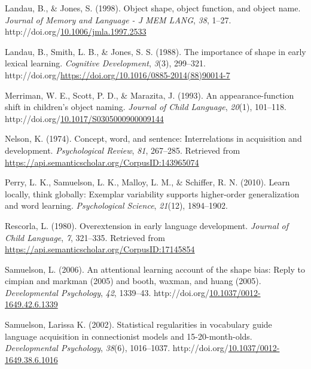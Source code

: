 \documentclass[10pt, letterpaper]{article}
\newenvironment{CSLReferences}%
  {}%
  {\par}
\begin{document}
\begin{CSLReferences}{1}{0}
\leavevmode{}%
Landau, B., \& Jones, S. (1998). Object shape, object function, and
object name. \emph{Journal of Memory and Language - J MEM LANG},
\emph{38}, 1--27.
http://doi.org/\href{https://doi.org/10.1006/jmla.1997.2533}{10.1006/jmla.1997.2533}

\leavevmode{}%
Landau, B., Smith, L. B., \& Jones, S. S. (1988). The importance of
shape in early lexical learning. \emph{Cognitive Development},
\emph{3}(3), 299--321.
http://doi.org/\url{https://doi.org/10.1016/0885-2014(88)90014-7}

\leavevmode{}%
Merriman, W. E., Scott, P. D., \& Marazita, J. (1993). An
appearance-function shift in children's object naming. \emph{Journal of
Child Language}, \emph{20}(1), 101--118.
http://doi.org/\href{https://doi.org/10.1017/S0305000900009144}{10.1017/S0305000900009144}

\leavevmode{}%
Nelson, K. (1974). Concept, word, and sentence: Interrelations in
acquisition and development. \emph{Psychological Review}, \emph{81},
267--285. Retrieved from
\url{https://api.semanticscholar.org/CorpusID:143965074}

\leavevmode{}%
Perry, L. K., Samuelson, L. K., Malloy, L. M., \& Schiffer, R. N.
(2010). Learn locally, think globally: Exemplar variability supports
higher-order generalization and word learning. \emph{Psychological
Science}, \emph{21}(12), 1894--1902.

\leavevmode{}%
Rescorla, L. (1980). Overextension in early language development.
\emph{Journal of Child Language}, \emph{7}, 321--335. Retrieved from
\url{https://api.semanticscholar.org/CorpusID:17145854}

\leavevmode{}%
Samuelson, L. (2006). An attentional learning account of the shape bias:
Reply to cimpian and markman (2005) and booth, waxman, and huang (2005).
\emph{Developmental Psychology}, \emph{42}, 1339--43.
http://doi.org/\href{https://doi.org/10.1037/0012-1649.42.6.1339}{10.1037/0012-1649.42.6.1339}

\leavevmode{}%
Samuelson, Larissa K. (2002). Statistical regularities in vocabulary
guide language acquisition in connectionist models and 15-20-month-olds.
\emph{Developmental Psychology}, \emph{38}(6), 1016--1037.
http://doi.org/\href{https://doi.org/10.1037/0012-1649.38.6.1016}{10.1037/0012-1649.38.6.1016}


\end{CSLReferences}
\end{document}
